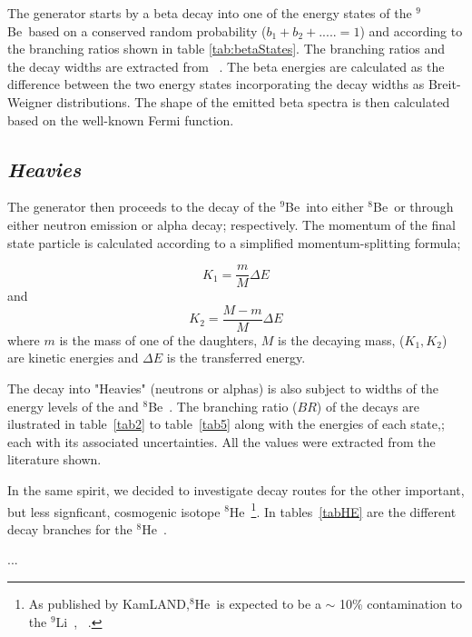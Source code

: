 \documentclass{JINST}
\newcommand{\li}{$^{9}$Li~}
\newcommand{\he}{$^{8}$He~}
\newcommand{\beEIGHT}{$^{8}$Be~}
\newcommand{\beNINE}{$^{9}$Be~}
\begin{document}
The generator starts by a beta decay into one of the energy states of the
\beNINE based on a conserved random probability ($b_{1} + b_{2} + .....= 1$) and
according to the branching ratios shown in table \ref{tab:betaStates}. The
branching ratios and the decay widths are extracted from ~\cite{Tilley2004155}. The beta
energies are calculated as the difference between the two energy states
incorporating the decay widths as Breit-Weigner distributions. The shape of the
emitted beta spectra is then calculated based on the well-known Fermi function.

\subsection*{\it Heavies}

The generator then proceeds to the decay of the \beNINE into either \beEIGHT or
\heFIVE through either neutron emission or alpha decay; respectively. The
momentum of
the final state particle is calculated according to 
a simplified momentum-splitting formula;

  \begin{equation}
K_1 =  \frac{m}{M} \Delta E
\end{equation}
and 
\begin{equation}
K_2 =  \frac{M-m}{M} \Delta E
\end{equation}
where $m$ is the mass of one of the daughters, $M$ is the decaying mass, ($K_1 , K_2$) are kinetic energies and
$\Delta E$ is the transferred energy. 

The decay into "Heavies" (neutrons or alphas) is also subject to widths of the
energy levels of the \heFIVE and \beEIGHT. The branching ratio ($BR$) of the
decays are ilustrated in table~\ref{tab2} to table~\ref{tab5} along with the energies of each
state,; each with its associated uncertainties. All the values were extracted
from the literature shown.

In the same spirit, we decided to investigate decay routes for the other important,
but less signficant, cosmogenic isotope \he \footnote{As published by KamLAND,\he is expected to be a $\sim$ 10\% contamination
to the \li, ~\cite{PhysRevC.81.025807}.}. In tables~\ref{tabHE} are the different decay
branches for the \he.






...
\end{document}
